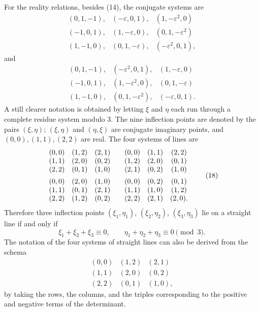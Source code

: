 \documentclass[11pt]{article}
\begin{document}
For the reality relations, besides (14), the conjugate systems are
\begin{equation}
\begin{array}{ccc}
(0,1,-1),&(-\varepsilon,0,1),&(1,-\varepsilon^2,0)\\
(-1,0,1),&(1,-\varepsilon,0),&(0,1,-\varepsilon^2)\\
(1,-1,0),&(0,1,-\varepsilon),&(-\varepsilon^2,0,1),
\end{array}
\tag{16}
\end{equation}
and
\begin{equation}
\begin{array}{ccc}
(0,1,-1),&(-\varepsilon^2,0,1),&(1,-\varepsilon,0)\\
(-1,0,1),&(1,-\varepsilon^2,0),&(0,1,-\varepsilon)\\
(1,-1,0),&(0,1,-\varepsilon^2),&(-\varepsilon,0,1).
\end{array}
\tag{17}
\end{equation}
A still clearer notation is obtained by letting $\xi$ and $\eta$ each run through a complete residue system modulo $3$. The nine inflection points are denoted by the pairs $(\xi,\eta)$; $(\xi,\eta)$ and $(\eta,\xi)$ are conjugate imaginary points, and $(0,0),(1,1),(2,2)$ are real. The four systems of lines are
\begin{equation}
\begin{array}{ccc@{\qquad}ccc}
(0,0)&(1,2)&(2,1)&(0,0)&(1,1)&(2,2)\\
(1,1)&(2,0)&(0,2)&(1,2)&(2,0)&(0,1)\\
(2,2)&(0,1)&(1,0)&(2,1)&(0,2)&(1,0)\\[0.5em]
(0,0)&(2,0)&(1,0)&(0,0)&(0,2)&(0,1)\\
(1,1)&(0,1)&(2,1)&(1,1)&(1,0)&(1,2)\\
(2,2)&(1,2)&(0,2)&(2,2)&(2,1)&(2,0).
\end{array}
\tag{18}
\end{equation}
Therefore three inflection points $(\xi_1,\eta_1)$, $(\xi_2,\eta_2)$, $(\xi_3,\eta_3)$ lie on a straight line if and only if
\begin{equation}
 \xi_1+\xi_2+\xi_3\equiv0,
 \qquad
 \eta_1+\eta_2+\eta_3\equiv0
 \pmod 3.
 \tag{19}
\end{equation}
The notation of the four systems of straight lines can also be derived from the schema
\begin{equation}
\begin{array}{ccc}
(0,0)&(1,2)&(2,1)\\
(1,1)&(2,0)&(0,2)\\
(2,2)&(0,1)&(1,0),
\end{array}
\tag{20}
\end{equation}
by taking the rows, the columns, and the triples corresponding to the positive and negative terms of the determinant.
\end{document}
